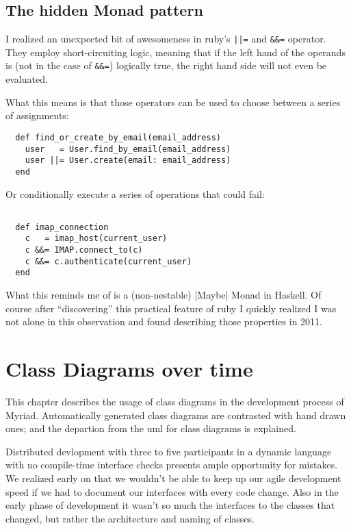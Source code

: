 \section{The hidden Monad pattern}

I realized an unexpected bit of awesomeness in \gls{ruby}'s \lstinline{||=} and \lstinline{&&=} operator. They employ short-circuiting logic, meaning that if the left hand of the operands is (not in the case of \lstinline{&&=}) logically true, the right hand side will not even be evaluated.

What this means is that those operators can be used to choose between a series of assignments:

\begin{lstlisting}
  def find_or_create_by_email(email_address)
    user   = User.find_by_email(email_address)
    user ||= User.create(email: email_address)
  end
\end{lstlisting}

Or conditionally execute a series of operations that could fail:

\begin{lstlisting}

  def imap_connection
    c   = imap_host(current_user)
    c &&= IMAP.connect_to(c)
    c &&= c.authenticate(current_user)
  end

\end{lstlisting}

What this reminds me of is a (non-nestable) |Maybe| Monad in Haskell. Of course after ``discovering'' this practical feature of \gls{ruby} I quickly realized I was not alone in this observation and found \citet{rubymonads} describing those properties in 2011.

\chapter{Class Diagrams over time}
\label{chapter:UMLDiagrams}

This chapter describes the usage of class diagrams in the development process of Myriad. Automatically generated class diagrams are contrasted with hand drawn ones; and the departion from the \gls{uml} for class diagrams is explained.

Distributed devlopment with three to five participants in a dynamic language with no compile-time interface checks presents ample opportunity for mistakes. We realized early on that we wouldn't be able to keep up our agile development speed if we had to document our interfaces with every code change. Also in the early phase of development it wasn't so much the interfaces to the classes that changed, but rather the architecture and naming of classes.

